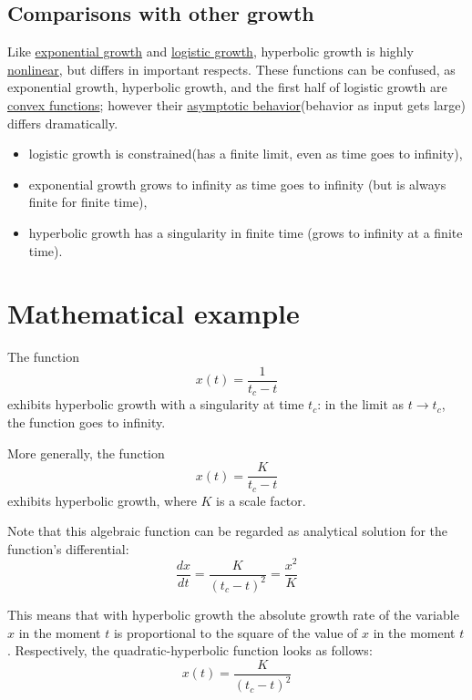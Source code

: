 \documentclass[lang=cn,11pt,a4paper,cite=numbers]{elegantpaper}
\begin{document}
\subsection{Comparisons with other growth}
  Like \href{https://en.wikipedia.org/wiki/Exponential_growth}{exponential growth} and \href{https://en.wikipedia.org/wiki/Logistic_growth}{logistic growth}, hyperbolic growth is highly \href{https://en.wikipedia.org/wiki/Nonlinear_system}{nonlinear}, but differs in important respects. These functions can be confused, as exponential growth, hyperbolic growth, and the first half of logistic growth are \href{https://en.wikipedia.org/wiki/Convex_function}{convex functions}; however their \href{https://en.wikipedia.org/wiki/Asymptotic_behavior}{asymptotic behavior}(behavior as input gets large) differs dramatically.
\begin{itemize}
  \item logistic growth is constrained(has a finite limit, even as time goes to infinity),
  \item exponential growth grows to infinity as time goes to infinity (but is always finite for finite time),
  \item hyperbolic growth has a singularity in finite time (grows to infinity at a finite time).
\end{itemize}

\section{Mathematical example}
  The function
\begin{equation}
  x(t)=\frac{1}{t_{c}-t}
\end{equation}
exhibits hyperbolic growth with a singularity at time $t_{c}$: in the limit as $t{\to}t_{c}$, the function goes to infinity.

  More generally, the function
\begin{equation}
  x(t)=\frac{K}{t_{c}-t}
\end{equation}
exhibits hyperbolic growth, where $K$ is a scale factor.

  Note that this algebraic function can be regarded as analytical solution for the function's differential\cite{korotaev2006introduction}:
\begin{equation}
  \frac{dx}{dt}=\frac{K}{(t_{c}-t)^{2}}=\frac{x^{2}}{K}
\end{equation}

  This means that with hyperbolic growth the absolute growth rate of the variable $x$ in the moment $t$ is proportional to the square of the value of $x$ in the moment $t$. Respectively, the quadratic-hyperbolic function looks as follows:
\begin{equation}
  x(t)=\frac{K}{(t_{c}-t)^{2}}
\end{equation}
\end{document}
